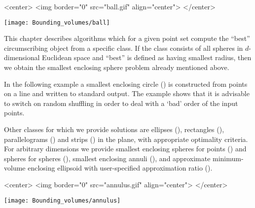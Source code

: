 
\begin{ccHtmlOnly}
<center>
<img border="0" src="ball.gif" align="center">
</center>
\end{ccHtmlOnly} 

\begin{ccTexOnly}
\begin{center}
\texttt{[image: Bounding\_volumes/ball]}
\end{center}
\end{ccTexOnly}


This chapter describes algorithms which for a given point set compute
the ``best'' circumscribing  object from a specific
class. If the class consists of all spheres in $d$-dimensional
Euclidean space and ``best'' is defined as having smallest radius,
then we obtain the smallest enclosing sphere problem already mentioned
above.

In the following example a smallest enclosing circle
() is constructed from points 
on a line and written to standard output. The example
shows that it is advisable to switch on random shuffling 
in order to deal with a `bad' order of the input points. 


Other classes for which we provide solutions are ellipses
(), rectangles
(), parallelograms
() and strips ()
in the plane, with appropriate optimality criteria. For arbitrary
dimensions we provide smallest enclosing spheres for points
() and spheres for spheres
(), smallest enclosing
annuli (), and approximate
minimum-volume enclosing ellipsoid with user-specified
approximation ratio ().

\begin{ccHtmlOnly}
<center>
<img border="0" src="annulus.gif" align="center">
</center>
\end{ccHtmlOnly} 

\begin{ccTexOnly}
\begin{center}
\texttt{[image: Bounding\_volumes/annulus]}
\end{center}
\end{ccTexOnly}


